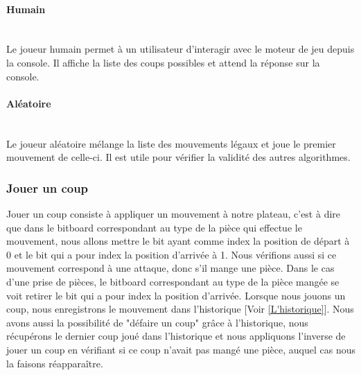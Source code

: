 \huge\documentclass{article}
\begin{document}
\paragraph{Humain}
~~\\
\newline
Le joueur humain permet à un utilisateur d'interagir avec le moteur de jeu depuis la console.
Il affiche la liste des coups possibles et attend la réponse sur la console.

\paragraph{Aléatoire}
~~\\
\newline
Le joueur aléatoire mélange la liste des mouvements légaux et joue le premier mouvement de celle-ci.
Il est utile pour vérifier la validité des autres algorithmes.

\subsubsection{Jouer un coup}\label{domove}
Jouer un coup consiste à appliquer un mouvement à notre plateau, c'est à dire que dans le bitboard correspondant au type de la pièce qui effectue le mouvement, nous allons mettre le bit ayant comme index la position de départ à 0 et le bit qui a pour index la position d'arrivée à 1.\newline 
Nous vérifions aussi si ce mouvement correspond à une attaque, donc s'il mange une pièce.\newline
Dans le cas d'une prise de pièces, le bitboard correspondant au type de la pièce mangée se voit retirer le bit qui a pour index la position d'arrivée.\newline
Lorsque nous jouons un coup, nous enregistrons le mouvement dans l'historique [Voir \ref{L'historique}].\newline
Nous avons aussi la possibilité de "défaire un coup" grâce à l'historique, nous récupérons le dernier coup joué dans l'historique et nous appliquons l'inverse de jouer un coup en vérifiant si ce coup n'avait pas mangé une pièce, auquel cas nous la faisons réapparaître.
\end{document}
